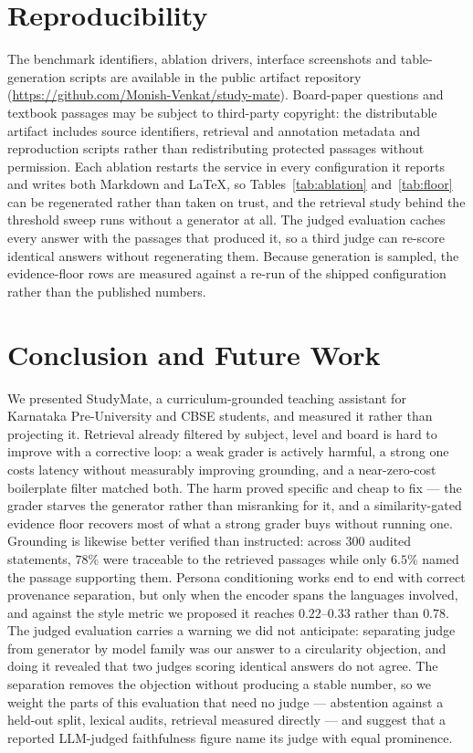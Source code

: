 \documentclass[conference]{IEEEtran}
\begin{document}
\section{Reproducibility}
\label{sec:repro}
The benchmark identifiers, ablation drivers, interface screenshots and
table-generation scripts are available in the public artifact repository
(\url{https://github.com/Monish-Venkat/study-mate}). Board-paper questions and
textbook passages may be subject to third-party copyright: the distributable
artifact includes source identifiers, retrieval and annotation metadata and
reproduction scripts rather than redistributing protected passages without
permission. Each ablation restarts the service in every configuration it reports
and writes both Markdown and \LaTeX{}, so Tables~\ref{tab:ablation}
and~\ref{tab:floor} can be regenerated rather than taken on trust, and the
retrieval study behind the threshold sweep runs without a generator at all. The
judged evaluation caches every answer with the passages that produced it, so a
third judge can re-score identical answers without regenerating them. Because
generation is sampled, the evidence-floor rows are measured against a re-run of
the shipped configuration rather than the published numbers.

\section{Conclusion and Future Work}
\label{sec:future}
We presented StudyMate, a curriculum-grounded teaching assistant for Karnataka
Pre-University and CBSE students, and measured it rather than projecting it.
Retrieval already filtered by subject, level and board is hard to improve with a
corrective loop: a weak grader is actively harmful, a strong one costs latency
without measurably improving grounding, and a near-zero-cost boilerplate filter
matched both. The harm proved specific and cheap to fix --- the grader starves
the generator rather than misranking for it, and a similarity-gated evidence
floor recovers most of what a strong grader buys without running one. Grounding
is likewise better verified than instructed: across $300$ audited statements,
$78\%$ were traceable to the retrieved passages while only $6.5\%$ named the
passage supporting them. Persona conditioning works end to end with correct
provenance separation, but only when the encoder spans the languages involved,
and against the style metric we proposed it reaches $0.22$--$0.33$ rather than
$0.78$. The judged evaluation carries a warning we did not anticipate:
separating judge from generator by model family was our answer to a circularity
objection, and doing it revealed that two judges scoring identical answers do
not agree. The separation removes the objection without producing a stable
number, so we weight the parts of this evaluation that need no judge ---
abstention against a held-out split, lexical audits, retrieval measured directly
--- and suggest that a reported LLM-judged faithfulness figure name its judge
with equal prominence.
\end{document}
